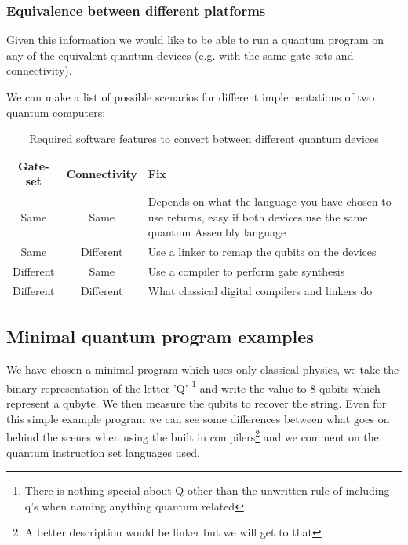 \subsubsection{Equivalence between different platforms}

Given this information we would like to be able to run a quantum program on any of the equivalent quantum devices (e.g. with the same gate-sets and connectivity). 

We can make a list of possible scenarios for different implementations of two quantum computers:
\begin{table}[h]
    \centering
    \begin{tabulary}{\textwidth}{|c|c||L|}
        \hline
        Gate-set & Connectivity & Fix  \\ \hline  
        Same & Same &  Depends on what the language you have chosen to use returns, easy if both devices use the same quantum Assembly language \footnotemark  \\ \hline
        Same & Different & Use a linker to remap the qubits on the devices \\ \hline
        Different & Same & Use a compiler to perform gate synthesis \\ \hline
        Different & Different & What classical digital compilers and linkers do \\ \hline 
    \end{tabulary}
    \caption{Required software features to convert between different quantum devices}
    \label{tab:gatesandconnectivity}
\end{table}


\subsection{Minimal quantum program examples}

We have chosen a minimal program which uses only classical physics, we take the binary representation of the letter 'Q' \footnote{There is nothing special about Q other than the unwritten rule of including q's when naming anything quantum related} and write the value to 8 qubits which represent a qubyte. We then measure the qubits to recover the string. Even for this simple example program we can see some differences between what goes on behind the scenes when using the built in compilers\footnote{A better description would be linker but we will get to that} and we comment on the quantum instruction set languages used. 

